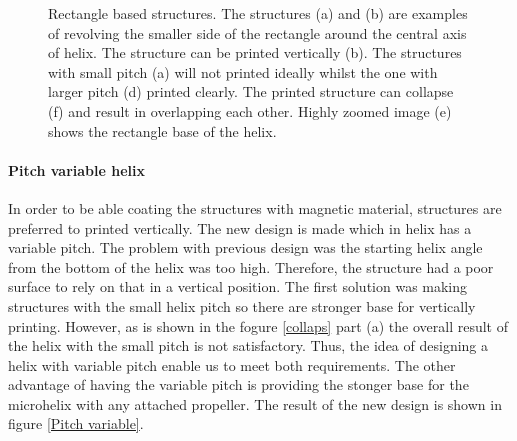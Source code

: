 \documentclass[12pt,a4paper,titlepage]{report}
\begin{document}
\begin{figure}
        \caption[Rectangle based structures]{Rectangle based structures. The structures (a) and (b) are examples of
revolving the smaller side of the rectangle around the central axis of helix. The structure 
can be printed vertically (b). The structures with small pitch (a) will not printed ideally whilst
the one with larger pitch (d) printed clearly. The printed structure can collapse (f)
and result in overlapping each other. Highly zoomed image (e) shows the rectangle base of the
helix.}\label{Rectangle based structures}

       

\end{figure}



\paragraph{Pitch variable helix}

In order to be able coating the structures with magnetic material, structures are preferred to printed vertically. 
The new design is made which in helix has a variable pitch. The problem with previous design was the starting helix
angle from the bottom of the helix was too high. Therefore, the structure had a poor surface to rely on that in a vertical
position. The first solution was making structures with the small helix pitch so there are stronger base for vertically
printing. However, as is shown in the fogure \ref{collaps} part (a) the overall result of the helix with the small pitch
is not satisfactory. Thus, the idea of designing a helix with variable pitch enable us to meet both requirements. The
other advantage of having the variable pitch is providing the stonger base for the microhelix with any attached 
propeller. The result of the new design is shown in figure \ref{Pitch variable}.
\end{document}

